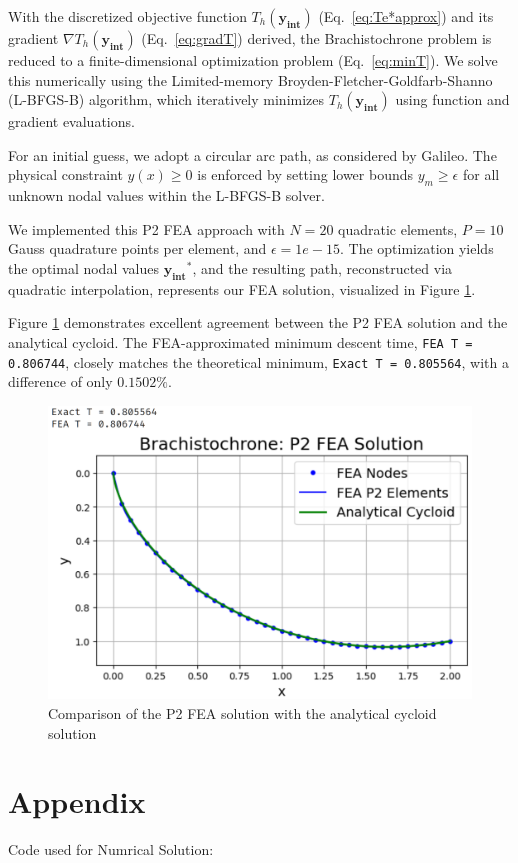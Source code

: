 \documentclass[11pt]{article}
\begin{document}
With the discretized objective function \( T_h(\mathbf{y_\text{int}}) \) (Eq.~\eqref{eq:Te*approx}) and its gradient \( \nabla T_h(\mathbf{y_\text{int}}) \) (Eq.~\eqref{eq:gradT}) derived, the Brachistochrone problem is reduced to a finite-dimensional optimization problem (Eq.~\eqref{eq:minT}). We solve this numerically using the Limited-memory Broyden-Fletcher-Goldfarb-Shanno (L-BFGS-B) algorithm, which iteratively minimizes \( T_h(\mathbf{y_\text{int}}) \) using function and gradient evaluations.

For an initial guess, we adopt a circular arc path, as considered by Galileo.  The physical constraint \(y(x) \ge 0\) is enforced by setting lower bounds \( y_m \ge \epsilon \) for all unknown nodal values within the L-BFGS-B solver.

We implemented this P2 FEA approach with $ N = 20 $ quadratic elements, $ P = 10 $ Gauss quadrature points per element, and $ \epsilon = 1e-15 $.  The optimization yields the optimal nodal values $ \mathbf{y_\text{int}}^{*} $, and the resulting path, reconstructed via quadratic interpolation, represents our FEA solution, visualized in Figure \ref{fig:1}.

Figure \ref{fig:1} demonstrates excellent agreement between the P2 FEA solution and the analytical cycloid. The FEA-approximated minimum descent time, \texttt{FEA T = 0.806744}, closely matches the theoretical minimum, \texttt{Exact T = 0.805564}, with a difference of only \(0.1502\%\).
\begin{figure}
    \centering
    \includegraphics[width=0.6\linewidth]{FEA_plot.png}
    \caption{Comparison of the P2 FEA solution with the analytical cycloid solution}
    \label{fig:1}
\end{figure}

\newpage
\section*{Appendix}
Code used for Numrical Solution:
\end{document}
